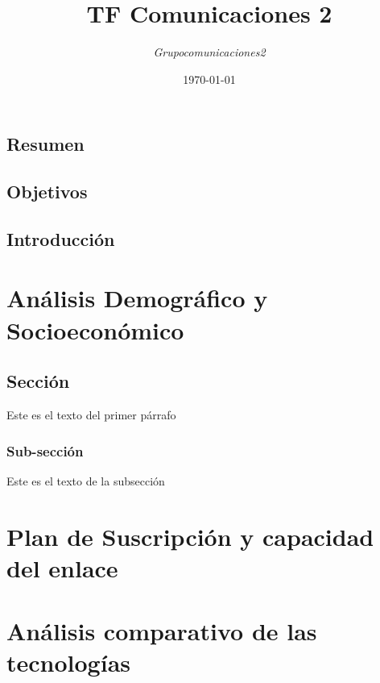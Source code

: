 \documentclass[10pt,a4paper]{report}
\title{\textbf{TF Comunicaciones 2}}
\author{\textit{Grupocomunicaciones2}}
\date{\today}
\begin{document}
\maketitle %

\section*{Resumen}
\newpage

\section*{Objetivos}
\newpage

\section*{Introducción}
\newpage

\tableofcontents                        %

\newpage

\chapter{Análisis Demográfico y Socioeconómico}

\section{Sección}
Este es el texto del primer párrafo

\subsection{Sub-sección}
Este es el texto de la subsección

\chapter{Plan de Suscripción y capacidad del enlace}



\chapter{Análisis comparativo de las tecnologías}
\end{document}
